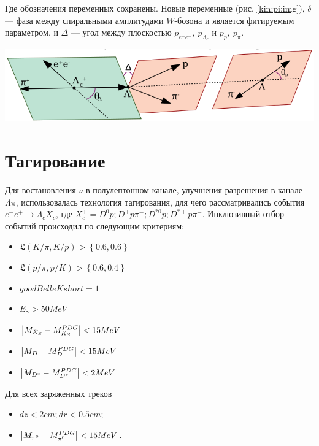 \documentclass[a0,portrait]{a0poster}
\newcommand{\inner}[1]{\left( #1 \right)}
\newcommand{\infig}[1]{\left\{ #1 \right\}}
\newcommand\tab[1][0.51cm]{\hspace*{#1}}
\begin{document}
\begin{mdframed}[style=MyFrame]
\begin{multicols}{2}
Где обозначения переменных сохранены. Новые переменные (рис. \ref{kin:pi:img}), $\delta$ --- фаза между спиральными амплитудами 
$W$-бозона и является фитируемым параметром, и $\Delta$ --- угол между плоскостью $p_{e^+ e^-}, \ p_{\Lambda_c}$ и $p_p, \ p_\pi$.

\begin{minipage}{\columnwidth}
    \includegraphics[width=0.9\columnwidth]{img/lpi_def.png}   
    \captionsetup{justification=centering,margin=2cm}
    \label{kin:pi:img}
\end{minipage}

\section{Тагирование}

\tab Для востановления $\nu$ в полулептонном канале, улучшения разрешения в канале $\Lambda \pi$, 
использовалась технология тагирования, для чего рассматривались 
события $e^- e^+ \to \Lambda_c X_c$, где $X^+_c = D^0 p; D^+ p \pi^-; D^{*0} p; D^{*+} p \pi^-$. 
Инклюзивный отбор событий происходил по следующим критериям:

\begin{multicols}{2}
    \begin{itemize}
        \item $\mathfrak L \inner{K/\pi, K/p} > \infig{0.6, 0.6}$
        \item $\mathfrak L \inner{p/\pi, p/K} > \infig{0.6, 0.4}$
        \item $goodBelleKshort = 1$
        \item $E_{\gamma} > 50 MeV$
        \item $\abs{M_{K_S} - M^{PDG}_{K_S}} < 15 MeV$
        \item $\abs{M_{D} - M_{D}^{PDG}} < 15 MeV$
        \item $\abs{M_{D^*} - M_{D^*}^{PDG}} < 2 MeV$
    \end{itemize}
    Для всех заряженных треков 
    \begin{itemize}
        \item $dz < 2 cm; dr < 0.5 cm$;
        \item $\abs{M_{\pi^0} - M^{PDG}_{\pi^0}} < 15 MeV$.
    \end{itemize}
\end{multicols}


\end{multicols}
\end{mdframed}
\end{document}
